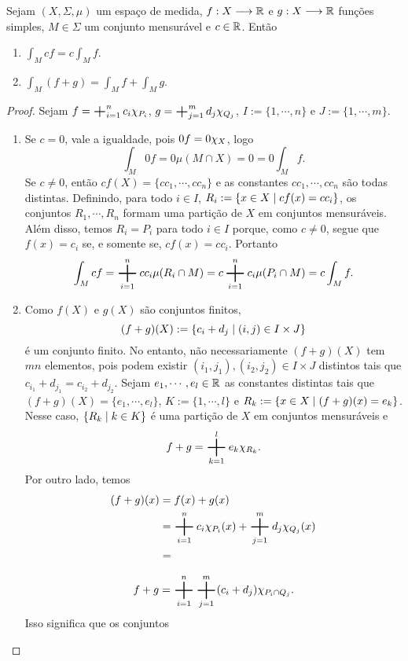 \begin{prop}
Sejam $(X,\Sigma,\mu)$ um espaço de medida, $f: X \longrightarrow \mathbb{R}$ e $g: X \longrightarrow \mathbb{R}$ funções simples, $M \in \Sigma$ um conjunto mensurável e $c \in \mathbb{R}$. Então
	\begin{enumerate}
	\item $\displaystyle\int_M cf = c\int_M f$.
	\item $\displaystyle\int_M (f+g) = \int_M f + \int_M g$.
	\end{enumerate}
\end{prop}
\begin{proof}
Sejam $f=\bigplus_{i=1}^n c_i \idc_{P_i}$, $g=\bigplus_{j=1}^m d_j \idc_{Q_j}$, $I := \{1,\cdots,n\}$ e $J := \{1,\cdots,m\}$.
\begin{enumerate}
	\item Se $c=0$, vale a igualdade, pois $0f=0\chi_X$, logo
	\begin{equation*}
	\int_M 0f = 0\mu(M \cap X) = 0 = 0\int_M f.
	\end{equation*}
Se $c \neq 0$, então $cf(X)=\{cc_1,\cdots,cc_n\}$ e as constantes $cc_1,\cdots,cc_n$ são todas distintas. Definindo, para todo $i \in I$, $R_i := \left\{x \in X \;\middle\vert\; cf(x)=cc_i \right\}$, os conjuntos $R_1,\cdots,R_n$ formam uma partição de $X$ em conjuntos mensuráveis. Além disso, temos $R_i=P_i$ para todo $i \in I$ porque, como $c \neq 0$, segue que $f(x)=c_i$ se, e somente se, $cf(x)=cc_i$. Portanto
	\begin{equation*}
	\int_M cf = \bigplus_{i=1}^n cc_i \mu(R_i \cap M) = c\bigplus_{i=1}^n c_i \mu(P_i \cap M) = c\int_M f.
	\end{equation*}
	
	\item Como $f(X)$ e $g(X)$ são conjuntos finitos,
	\begin{equation*}
	(f+g)(X) := \left\{c_i+d_j \;\middle\vert\; (i,j) \in I \times J \right\}
	\end{equation*}
é um conjunto finito. No entanto, não necessariamente $(f+g)(X)$ tem $mn$ elementos, pois podem existir $(i_1,j_1),(i_2,j_2) \in I \times J$ distintos tais que $c_{i_1}+d_{j_1}=c_{i_2}+d_{j_2}$. Sejam $e_1,\cdots,e_l \in \mathbb{R}$ as constantes distintas tais que $(f+g)(X)=\{e_1,\cdots,e_l\}$, $K := \{1,\cdots,l\}$ e $R_k := \left\{x \in X \;\middle\vert\; (f+g)(x)=e_k \right\}$. Nesse caso, $\left\{R_k \;\middle\vert\; k \in K \right\}$ é uma partição de $X$ em conjuntos mensuráveis e
	\begin{equation*}
	f+g=\bigplus_{k=1}^l e_k \idc_{R_k}.
	\end{equation*}
Por outro lado, temos
	\begin{align*}
	(f+g)(x) &= f(x)+g(x) \\
				&= \bigplus_{i=1}^n c_i \idc_{P_i}(x) + \bigplus_{j=1}^m d_j \idc_{Q_j}(x) \\
				&= 
	\end{align*}
	

	\begin{equation*}
	f+g = \bigplus_{i=1}^n \bigplus_{j=1}^m (c_i+d_j) \idc_{P_i \cap Q_j}.
	\end{equation*}
 Isso significa que os conjuntos
\end{enumerate}
\end{proof}